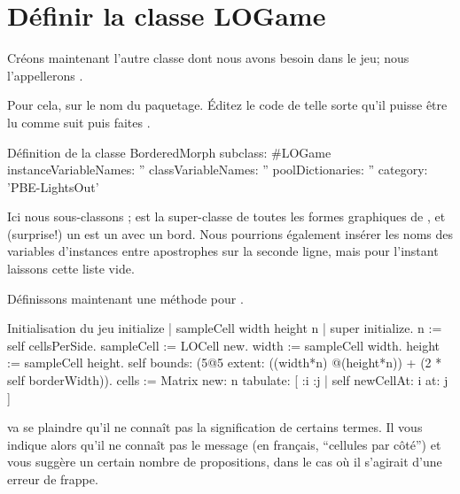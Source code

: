\documentclass[a4paper,10pt,twoside]{book}
\begin{document}
\section{Définir la classe LOGame}

Créons maintenant l'autre classe dont nous avons besoin dans le jeu; nous l'appellerons .

Pour cela, \clickz{} sur le nom du paquetage.
Éditez le code de telle sorte qu'il puisse être lu comme suit puis faites .

\begin{classdef}[sbegame]{Définition de la classe }
BorderedMorph subclass: #LOGame
   instanceVariableNames: ''
   classVariableNames: ''
   poolDictionaries: ''
   category: 'PBE-LightsOut'
\end{classdef}

Ici nous sous-classons ;  est la
super-classe de toutes les formes graphiques de \pharo, et (surprise!)
un  est un  avec un bord.  
Nous pourrions également insérer les noms des variables d'instances
entre apostrophes sur la seconde ligne, mais pour l'instant 
laissons cette liste vide.

Définissons maintenant une méthode  pour .


\begin{numMethod}[sbegameinitialize]{Initialisation du jeu}
initialize
   | sampleCell width height n |
   super initialize.
   n := self cellsPerSide.
   sampleCell := LOCell new.
   width := sampleCell width.
   height := sampleCell height.
   self bounds: (5@5 extent: ((width*n) @(height*n)) + (2 * self borderWidth)).
   cells := Matrix new: n tabulate: [ :i :j | self newCellAt: i at: j ]
\end{numMethod}


\pharo va se plaindre qu'il ne connaît pas la signification de
certains termes.
Il vous indique alors qu'il ne connaît pas le message
 (en français, ``cellules par côté'') et
vous suggère un certain nombre de propositions, dans le cas où il
s'agirait d'une erreur de frappe.
\end{document}
